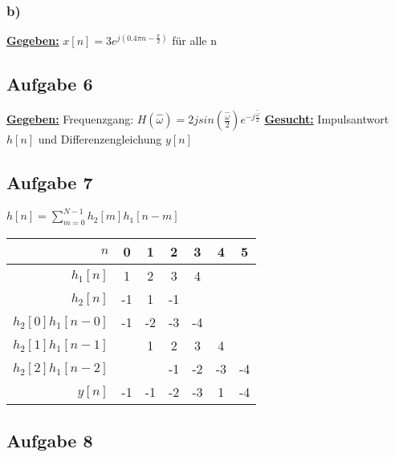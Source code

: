 \documentclass[12pt]{scrreprt}
\begin{document}
\subsubsection*{b)}
\underline{\textbf{Gegeben:}}\newline
\hspace*{5mm}$x[n]=3e^{j(0.4\pi n - \frac{\pi}{2})}$ für alle n\newline
\hspace*{5mm}

\subsection*{Aufgabe 6}
\underline{\textbf{Gegeben:}}\newline
\hspace*{5mm}Frequenzgang: $H(\hat{\omega})=2jsin(\frac{\hat{\omega}}{2})e^{-j\frac{\hat{\omega}}{2}}$\newline
\underline{\textbf{Gesucht:}}\newline
\hspace*{5mm}Impulsantwort $h[n]$ und Differenzengleichung $y[n]$\newline

\subsection*{Aufgabe 7}
\hspace*{5mm}$h[n]=\sum_{m=0}^{N-1}h_2[m]h_1[n-m]$\newline
\newline
\begin{tabular}{r|cccccc}
$n$ 				&  0  &  1  &  2  & 3   &  4  & 5 \\\hline
$h_1[n]$			&  1  &  2  &  3  & 4   &     &   \\
$h_2[n]$			& -1  &  1  & -1  &     &     &   \\\hline
$h_2[0]h_1[n-0]$	& -1  & -2  & -3  & -4  &     &   \\
$h_2[1]h_1[n-1]$	&     &  1  &  2  &  3  &  4  &   \\
$h_2[2]h_1[n-2]$	&     &     & -1  & -2  & -3  & -4\\\hline
$y[n]$              & -1  & -1  & -2  & -3  &  1  & -4\\
\end{tabular}

\subsection*{Aufgabe 8}
\end{document}
